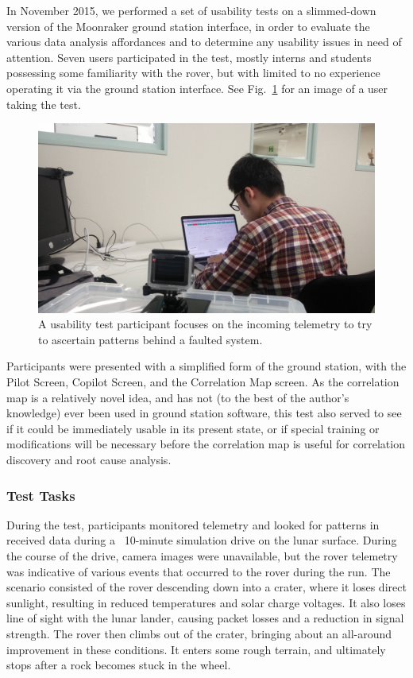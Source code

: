 In November 2015, we performed a set of usability tests on a slimmed-down version of the Moonraker ground station interface, in order to evaluate the various data analysis affordances and to determine any usability issues in need of attention. Seven users participated in the test, mostly interns and students possessing some familiarity with the rover, but with limited to no experience operating it via the ground station interface. See Fig.~\ref{fig:ui_test_takako} for an image of a user taking the test.

\begin{figure}[h]
\centering
    \includegraphics[width=\columnwidth]{images/ui_test_takuto.jpg}
    \caption{A usability test participant focuses on the incoming telemetry to try to ascertain patterns behind a faulted system.}
    \label{fig:ui_test_takako}
\end{figure}

Participants were presented with a simplified form of the ground station, with the Pilot Screen, Copilot Screen, and the Correlation Map screen. As the correlation map is a relatively novel idea, and has not (to the best of the author's knowledge) ever been used in ground station software, this test also served to see if it could be immediately usable in its present state, or if special training or modifications will be necessary before the correlation map is useful for correlation discovery and root cause analysis.

\subsubsection{Test Tasks}

During the test, participants monitored telemetry and looked for patterns in received data during a ~10-minute simulation drive on the lunar surface. During the course of the drive, camera images were unavailable, but the rover telemetry was indicative of various events that occurred to the rover during the run. The scenario consisted of the rover descending down into a crater, where it loses direct sunlight, resulting in reduced temperatures and solar charge voltages. It also loses line of sight with the lunar lander, causing packet losses and a reduction in signal strength. The rover then climbs out of the crater, bringing about an all-around improvement in these conditions. It enters some rough terrain, and ultimately stops after a rock becomes stuck in the wheel.

